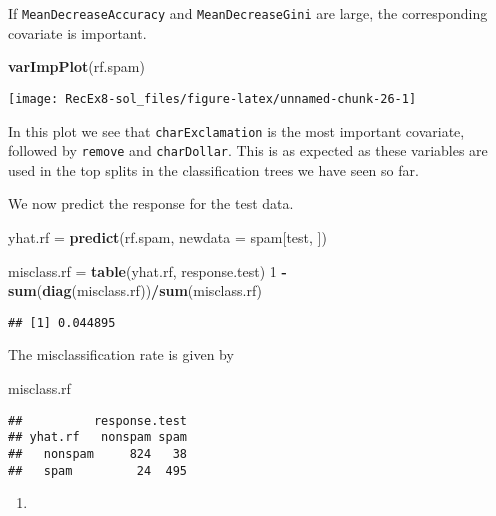 \documentclass[]{article}
\newenvironment{Shaded}{\begin{snugshade}}{\end{snugshade}}
\newcommand{\DataTypeTok}[1]{\textcolor[rgb]{0.13,0.29,0.53}{#1}}
\newcommand{\DecValTok}[1]{\textcolor[rgb]{0.00,0.00,0.81}{#1}}
\newcommand{\KeywordTok}[1]{\textcolor[rgb]{0.13,0.29,0.53}{\textbf{#1}}}
\newcommand{\NormalTok}[1]{#1}
\newcommand{\OperatorTok}[1]{\textcolor[rgb]{0.81,0.36,0.00}{\textbf{#1}}}
\newcommand{\StringTok}[1]{\textcolor[rgb]{0.31,0.60,0.02}{#1}}
\begin{document}
If \texttt{MeanDecreaseAccuracy} and \texttt{MeanDecreaseGini} are
large, the corresponding covariate is important.

\begin{Shaded}
\begin{Highlighting}[]
\KeywordTok{varImpPlot}\NormalTok{(rf.spam)}
\end{Highlighting}
\end{Shaded}

\texttt{[image: RecEx8-sol\_files/figure-latex/unnamed-chunk-26-1]}

In this plot we see that \texttt{charExclamation} is the most important
covariate, followed by \texttt{remove} and \texttt{charDollar}. This is
as expected as these variables are used in the top splits in the
classification trees we have seen so far.

We now predict the response for the test data.

\begin{Shaded}
\begin{Highlighting}[]
\NormalTok{yhat.rf =}\StringTok{ }\KeywordTok{predict}\NormalTok{(rf.spam, }\DataTypeTok{newdata =}\NormalTok{ spam[test, ])}

\NormalTok{misclass.rf =}\StringTok{ }\KeywordTok{table}\NormalTok{(yhat.rf, response.test)}
\DecValTok{1} \OperatorTok{-}\StringTok{ }\KeywordTok{sum}\NormalTok{(}\KeywordTok{diag}\NormalTok{(misclass.rf))}\OperatorTok{/}\KeywordTok{sum}\NormalTok{(misclass.rf)}
\end{Highlighting}
\end{Shaded}

\begin{verbatim}
## [1] 0.044895
\end{verbatim}

The misclassification rate is given by

\begin{Shaded}
\begin{Highlighting}[]
\NormalTok{misclass.rf}
\end{Highlighting}
\end{Shaded}

\begin{verbatim}
##          response.test
## yhat.rf   nonspam spam
##   nonspam     824   38
##   spam         24  495
\end{verbatim}

\begin{enumerate}
\def\labelenumi{\alph{enumi})}
\setcounter{enumi}{7}
\item
\end{enumerate}
\end{document}
